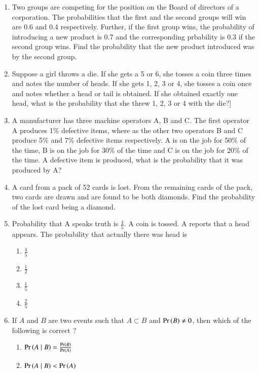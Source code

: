 \begin{enumerate}[label=\thesubsection.\arabic*,ref=\thesubsection.\theenumi]
\item Two groups are competing for the position on the Board of directors of a
corporation. The probabilities that the first and the second groups will win are
0.6 and 0.4 respectively. Further, if the first group wins, the probability of
introducing a new product is 0.7 and the corresponding prbability is 0.3 if the
second group wins. Find the probability that the new product introduced was by
the second group.
\\
\solution

\item Suppose a girl throws a die. If she gets a 5 or 6, she tosses a coin three times and
notes the number of heads. If she gets 1, 2, 3 or 4, she tosses a coin once and
notes whether a head or tail is obtained. If she obtained exactly one head, what
is the probability that she threw 1, 2, 3 or 4 with the die?]
\item A manufacturer has three machine operators A, B and C. The first operator A
produces 1\% defective items, where as the other two operators B and C produce 5\% and 7\% defective items respectively. A is on the job for 50\% of the
time, B is on the job for 30\% of the time and C is on the job for 20\% of the time.
A defective item is produced, what is the probability that it was produced by A?
\item A card from a pack of 52 cards is lost. From the remaining cards of the pack,
two cards are drawn and are found to be both diamonds. Find the probability of
the lost card being a diamond.
%
\item Probability that A speaks truth is
$\frac{4}{5}$. A coin is tossed. A reports that a head
appears. The probability that actually there was head is
\begin{multicols}{4}
\begin{enumerate}
\item $\frac{4}{5}$ 
\item $\frac{1}{2}$ 
\item $\frac{1}{5}$ 
\item $\frac{2}{5}$
\end{enumerate}
\end{multicols}
\solution

\item 
		If $A$ and $B$ are two events such that $A \subset B$ and $\Pr\left(B\right) \neq 0$, then which of the following is correct ?
\begin{enumerate}
\item $\Pr\left(A \mid B\right) = \frac{\Pr\left(B\right)}{\Pr\left(A\right)}$ 
\item $\Pr\left(A \mid B\right) < \Pr\left(A\right)$

\end{enumerate}
\end{enumerate}
